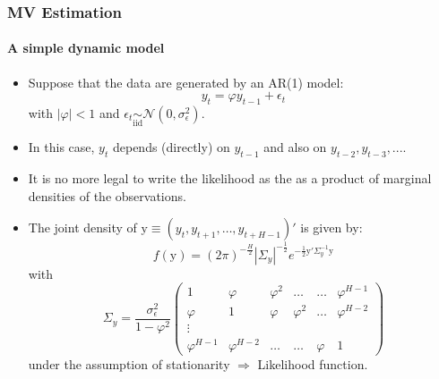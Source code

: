 \documentclass[10pt,slidestop]{beamer}
\newcommand{\normal}[2]{\mathcal N\left(#1,#2\right)}
\begin{document}
\begin{frame}
  \frametitle{MV Estimation}
  \framesubtitle{A simple dynamic model}
  \begin{itemize}
  \item Suppose that the data are generated by an AR(1) model:
    \[
    y_t = \varphi y_{t-1} + \epsilon_t
    \]
    with $|\varphi|<1$ and
    $\epsilon_t\underset{\mathrm{iid}}{\sim}\normal{0}{\sigma_{\epsilon}^2}$.

    \medskip

  \item In this case, $y_t$ depends (directly) on  $y_{t-1}$ and also
    on $y_{t-2}, y_{t-3}, ...$.

    \medskip

  \item It is no more legal to write the likelihood as the  as a product of
    marginal densities of the observations.

    \medskip

  \item The joint density of $\mathrm y \equiv
      (y_t,y_{t+1},\dots,y_{t+H-1})'$ is given by:
      \[
      f(\mathrm y) = (2\pi)^{-\frac{H}{2}}|\Sigma_y|^{-\frac{1}{2}}e^{-\frac{1}{2}\mathrm
        y'\Sigma_{y}^{-1}\mathrm y}
      \]
      with
      {\tiny\[
      \Sigma_y = \frac{\sigma^{2}_{\epsilon}}{1-\varphi^2}
      \begin{pmatrix}
        1    & \varphi         & \varphi^2 & \dots     & \dots   & \varphi^{H-1} \\
  \varphi    & 1               & \varphi   & \varphi^2 & \dots   & \varphi^{H- 2} \\
   \vdots    &                 &           &           &         &               \\
\varphi^{H-1} & \varphi^{H- 2}   & \dots      & \dots    & \varphi  & 1
      \end{pmatrix}
      \]}
    under the assumption of stationarity $\Rightarrow$ Likelihood function.
  \end{itemize}
  \end{frame}
\end{document}
